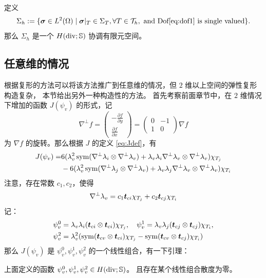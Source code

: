 \documentclass[letterpaper,12pt]{article}
\begin{document}
定义 
$$
\Sigma_h := \{\boldsymbol{\sigma} \in L^2(\Omega) \mid \boldsymbol{\sigma}|_T \in \Sigma_T, \forall T \in
\mathcal{T}_h, \text{ and Dof} \eqref{eq:dof1} \text{ is single valued}\}.
$$
那么 $\Sigma_h$ 是一个 $H(\operatorname{div}; \mathbb{S})$ 协调有限元空间。

\subsection{任意维的情况}
根据复形的方法可以将该方法推广到任意维的情况，但 $2$
维以上空间的弹性复形构造复杂，
本节给出另外一种构造性的方法。
首先考察前面章节中，在 $2$ 维情况下增加的函数 $J(\psi_v)$ 的形式，记 
$$
\nabla^{\perp}f = \begin{pmatrix}
-\frac{\partial f}{\partial y} \\ \frac{\partial f}{\partial x} \end{pmatrix} = 
    \begin{pmatrix}
        0 & -1\\ 1 & 0
    \end{pmatrix}\nabla f
$$
为 $\nabla f$ 的旋转。那么根据 $J$ 的定义 \eqref{eq:Jdef}，有 
$$
\begin{aligned}
J(\psi_v) = & 6(\lambda_v^2 \operatorname{sym}(\nabla^{\perp} \lambda_i\otimes \nabla^{\perp}
    \lambda_v) + \lambda_v\lambda_i \nabla^{\perp} \lambda_v\otimes
\nabla^{\perp} \lambda_v)\chi_{T_j}\\
& - 6(\lambda_v^2 \operatorname{sym}(\nabla^{\perp}
\lambda_j\otimes \nabla^{\perp}
    \lambda_v) + \lambda_v\lambda_j \nabla^{\perp} \lambda_v\otimes
\nabla^{\perp} \lambda_v)\chi_{T_i}
\end{aligned}
$$
注意，存在常数 $c_1, c_2$，使得
$$
\nabla^{\perp} \lambda_v = c_1 \boldsymbol{t}_{ci}\chi_{T_j} + c_2 \boldsymbol{t}_{cj}\chi_{T_i}
$$
记：
$$
\begin{aligned}
    \psi_v^0 & = \lambda_v \lambda_i (\boldsymbol{t}_{ci} \otimes \boldsymbol{t}_{ci})\chi_{T_j},
    \quad 
    \psi_v^1 = \lambda_v \lambda_j (\boldsymbol{t}_{cj} \otimes \boldsymbol{t}_{cj})\chi_{T_i},\\
    \psi_v^2 & = \lambda_v^2 (\operatorname{sym}(\boldsymbol{t}_{cv}\otimes \boldsymbol{t}_{ci})\chi_{T_j} -
    \operatorname{sym}(\boldsymbol{t}_{cv}\otimes \boldsymbol{t}_{cj})\chi_{T_i})
\end{aligned}
$$
那么 $J(\psi_v)$ 是 $\psi_v^0, \psi_v^1, \psi_v^2$ 的一个线性组合，有一下引理：
\begin{lemma}
\label{lem:diver}
上面定义的函数 $\psi_v^0, \psi_v^1, \psi_v^2 \in H(\operatorname{div}; \mathbb{S})$。
且存在某个线性组合散度为零。
\end{lemma}
\end{document}
